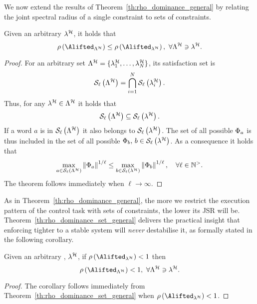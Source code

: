 We now extend the results of Theorem~\ref{th:rho_dominance_general} by relating the joint spectral radius of a single constraint to sets of constraints.
\begin{theorem}%
    \label{th:rho_dominance_set_general}%
    Given an arbitrary \ewhc{} $\lambda^{\mathcal{H}}$, it holds that
    \begin{equation*}
        \rho\left(\Alifted_{\Lambda^\strat}\right) \leq \rho \left( \Alifted_{\lambda^\strat} \right) ,\,\, \forall \Lambda^\strat \ni \lambda^\strat.
    \end{equation*}
    \begin{proof}
        For an arbitrary \ewhc{} set $\Lambda^{\mathcal{H}} = \{\lambda^{\mathcal{H}}_1, \dots, \lambda^{\mathcal{H}}_N\}$, its satisfaction set is 
        \begin{equation*}%
            \sset{\ell}{\Lambda^\strat} = \bigcap_{i = 1}^N \sset{\ell}{\lambda^\strat_i}.
        \end{equation*}
        Thus, for any $\lambda^{\mathcal{H}} \in \Lambda^{\mathcal{H}}$ it holds that 
        \begin{equation*}
            \mathcal{S}_{\ell}\left( \Lambda^{\mathcal{H}} \right) \subseteq \mathcal{S}_{\ell}\left( \lambda^{\mathcal{H}} \right).
        \end{equation*}
        If a word $a$ is in $\mathcal{S}_{\ell}\left( \Lambda^{\mathcal{H}} \right)$ it also belongs to $\mathcal{S}_{\ell}\left( \lambda^{\mathcal{H}} \right)$. 
        The set of all possible $\Phi{}_{a}$ is thus included in the set of all possible $\Phi{}_{b},\, b \in \mathcal{S}_{\ell}\left( \lambda^{\mathcal{H}} \right)$.
        As a consequence it holds that
        \begin{equation*}
            \max_{a \in \mathcal{S}_{\ell}\left( \Lambda^{\mathcal{H}}  \right)} \left\lVert\Phi{}_{a}\right\rVert^{1/\ell} \leq
            \max_{b \in \mathcal{S}_{\ell}\left( \lambda^{\mathcal{H}}  \right)} \left\lVert\Phi{}_{b}\right\rVert^{1/\ell}, \quad
            \forall \ell\in\mathbb{N}^{>}.
        \end{equation*}
        The theorem follows immediately when $\ell\rightarrow \infty$.
    \end{proof}
\end{theorem}

As in Theorem~\ref{th:rho_dominance_general}, the more we restrict the execution pattern of the control task with sets of constraints, the lower its JSR will be.
Theorem~\ref{th:rho_dominance_set_general} delivers the practical insight that enforcing tighter \ewhc{} to a stable system will \emph{never} destabilise it, as formally stated in the following corollary.
\begin{corollary}%
    \label{cor:rho_dominance_set}%
    Given an arbitrary \ewhc{}, $\lambda^{\mathcal{H}}$, if $\rho \left( \Alifted_{\lambda^\strat} \right) < 1$ then
    \begin{equation*}
        \rho\left(\Alifted_{\Lambda^\strat}\right) < 1 ,\,\, \forall \Lambda^\strat \ni \lambda^\strat.
    \end{equation*}

    \begin{proof}
        The corollary follows immediately from Theorem~\ref{th:rho_dominance_set_general} when $\rho \left( \Alifted_{\lambda^\strat} \right) < 1$.
    \end{proof}
\end{corollary}
